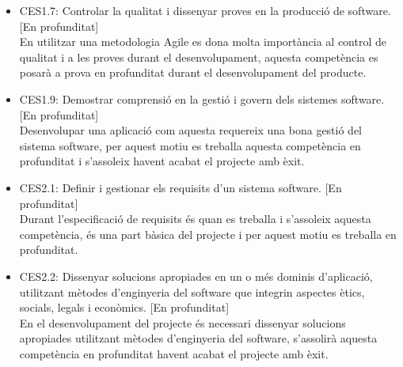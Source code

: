 \begin{itemize}
\item{}CES1.7: Controlar la qualitat i dissenyar proves en la producció de software. [En profunditat]\\
En utilitzar una metodologia Agile es dona molta importància al control de
qualitat i a les proves durant el desenvolupament, aquesta competència es posarà a prova en profunditat durant el desenvolupament del producte.
\item{}CES1.9: Demostrar comprensió en la gestió i govern dels sistemes software. [En profunditat]\\
Desenvolupar una aplicació com aquesta requereix una bona gestió del sistema software, per aquest motiu es treballa aquesta competència en profunditat i s'assoleix havent acabat el projecte amb èxit.
\item{}CES2.1: Definir i gestionar els requisits d'un sistema software. [En profunditat]\\
Durant l'especificació de requisits és quan es treballa i s'assoleix aquesta competència, és una part bàsica del projecte i per aquest motiu es treballa en profunditat.
\item{}CES2.2: Dissenyar solucions apropiades en un o més dominis d'aplicació, utilitzant mètodes d'enginyeria del software que integrin aspectes ètics, socials, legals i econòmics. [En profunditat]\\
En el desenvolupament del projecte és necessari dissenyar solucions apropiades utilitzant mètodes d'enginyeria del software, s'assolirà aquesta competència en profunditat havent acabat el projecte amb èxit.
\end{itemize}

